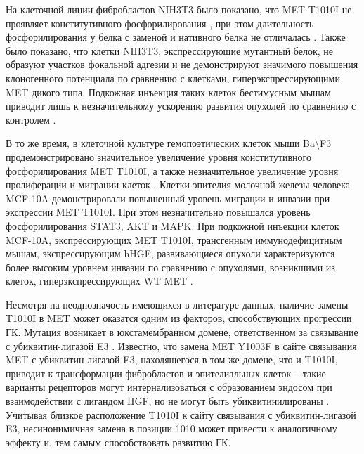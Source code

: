 На клеточной линии фибробластов NIH3T3 было показано, что MET T1010I не проявляет конститутивного фосфорилирования \cite{schmidt_novel_1999}, при этом длительность фосфорилирования у белка с заменой и нативного белка не отличалась \cite{lee_novel_2000}. Также было показано, что клетки NIH3T3, экспрессирующие мутантный белок, не образуют участков фокальной адгезии и не демонстрируют значимого повышения клоногенного потенциала по сравнению с клетками, гиперэкспрессирующими MET дикого типа. Подкожная инъекция таких клеток бестимусным мышам приводит лишь к незначительному ускорению развития опухолей по сравнению с контролем  \cite{lee_novel_2000}. 

В то же время, в клеточной культуре гемопоэтических клеток мыши Ba\textbackslash F3 продемонстрировано значительное увеличение уровня конститутивного фосфорилирования MET T1010I, а также незначительное увеличение уровня пролиферации и миграции клеток \cite{ma_c-met_2003}. Клетки эпителия молочной железы человека MCF-10A демонстрировали повышенный уровень миграции и инвазии при экспрессии MET T1010I. При этом незначительно повышался уровень фосфорилирования STAT3, AKT и MAPK. При подкожной инъекции клеток MCF-10A, экспрессирующих MET T1010I, трансгенным иммунодефицитным мышам, экспрессирующим hHGF, развивающиеся опухоли характеризуются более высоким уровнем инвазии по сравнению с опухолями, возникшими из клеток, гиперэкспрессирующих WT MET \cite{liu_functional_2015}. 

Несмотря на неоднозначость имеющихся в литературе данных, наличие замены T1010I в MET может оказатся одним из факторов, способствующих прогрессии ГК. Мутация возникает в юкстамембранном домене, ответственном за связывание с убиквитин-лигазой E3 \cite{trusolino_met_2010}. Известно, что замена MET Y1003F в сайте связывания MET с убиквитин-лигазой E3, находящегося в том же домене, что и T1010I, приводит к трансформации фибробластов и эпителиальных клеток – такие варианты рецепторов могут интернализоваться с образованием эндосом при взаимодействии с лигандом HGF, но не могут быть убиквитинилированы \cite{peschard_mutation_2001}. Учитывая близкое расположение T1010I к сайту связывания с убиквитин-лигазой E3, несинонимичная замена в позиции 1010 может привести к аналогичному эффекту и, тем самым способствовать развитию ГК.

